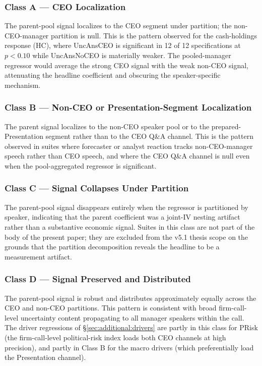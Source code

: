 \subsubsection{Class A --- CEO Localization}

The parent-pool signal localizes to the CEO segment under partition; the non-CEO-manager partition is null. This is the pattern observed for the cash-holdings response (HC), where UncAnsCEO is significant in 12 of 12 specifications at $p<0.10$ while UncAnsNoCEO is materially weaker. The pooled-manager regressor would average the strong CEO signal with the weak non-CEO signal, attenuating the headline coefficient and obscuring the speaker-specific mechanism.

\subsubsection{Class B --- Non-CEO or Presentation-Segment Localization}

The parent signal localizes to the non-CEO speaker pool or to the prepared-Presentation segment rather than to the CEO Q\&A channel. This is the pattern observed in suites where forecaster or analyst reaction tracks non-CEO-manager speech rather than CEO speech, and where the CEO Q\&A channel is null even when the pool-aggregated regressor is significant.

\subsubsection{Class C --- Signal Collapses Under Partition}

The parent-pool signal disappears entirely when the regressor is partitioned by speaker, indicating that the parent coefficient was a joint-IV nesting artifact rather than a substantive economic signal. Suites in this class are not part of the body of the present paper; they are excluded from the v5.1 thesis scope on the grounds that the partition decomposition reveals the headline to be a measurement artifact.

\subsubsection{Class D --- Signal Preserved and Distributed}

The parent-pool signal is robust and distributes approximately equally across the CEO and non-CEO partitions. This pattern is consistent with broad firm-call-level uncertainty content propagating to all manager speakers within the call. The driver regressions of \S\ref{sec:additional:drivers} are partly in this class for PRisk (the firm-call-level political-risk index loads both CEO channels at high precision), and partly in Class B for the macro drivers (which preferentially load the Presentation channel).

